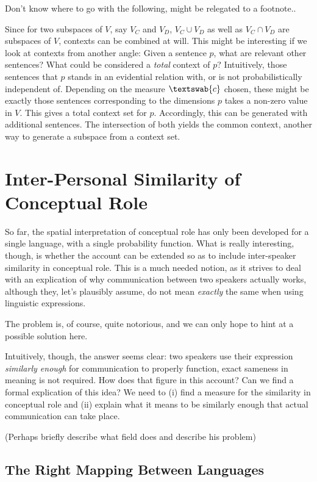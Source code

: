 \documentclass[11pt, a4paper]{scrartcl}
\renewcommand{\i}[1]{\emph{#1}}
\newcommand{\m}[1]{\textswab{#1}}
\begin{document}
Don't know where to go with the following, might be relegated to a footnote..

Since for two subspaces of $V$, say $V_C$ and $V_D$, $V_C \cup V_D$ as well as $V_C \cap V_D$ are subspaces of $V$, contexts can be combined at will. This might be interesting if we look at contexts from another angle: Given a sentence $p$, what are relevant other sentences? What could be considered a \i{total} context of $p$? Intuitively, those sentences that $p$ stands in an evidential relation with, or is not probabilistically independent of. Depending on the measure $\m{c}$ chosen, these might be exactly those sentences corresponding to the dimensions $p$ takes a non-zero value in $V$. This gives a total context set for $p$. Accordingly, this can be generated with additional sentences. The intersection of both yields the common context, another way to generate a subspace from a context set. 



\section{Inter-Personal Similarity of Conceptual Role}

So far, the spatial interpretation of conceptual role has only been developed for a single language, with a single probability function. What is really interesting, though, is whether the account can be extended so as to include inter-speaker similarity in conceptual role. This is a much needed notion, as it strives to deal with an explication of why communication between two speakers actually works, although they, let's plausibly assume, do not mean \i{exactly} the same when using linguistic expressions. 

The problem is, of course, quite notorious, and we can only hope to hint at a possible solution here.

Intuitively, though, the answer seems clear: two speakers use their expression \i{similarly enough} for communication to properly function, exact sameness in meaning is not required. How does that figure in this account? Can we find a formal explication of this idea? We need to (i) find a measure for the similarity in conceptual role and (ii) explain what it means to be similarly enough that actual communication can take place.


{\color{red} (Perhaps briefly describe what field does and describe his problem)}

\subsection{The Right Mapping Between Languages}
\end{document}
